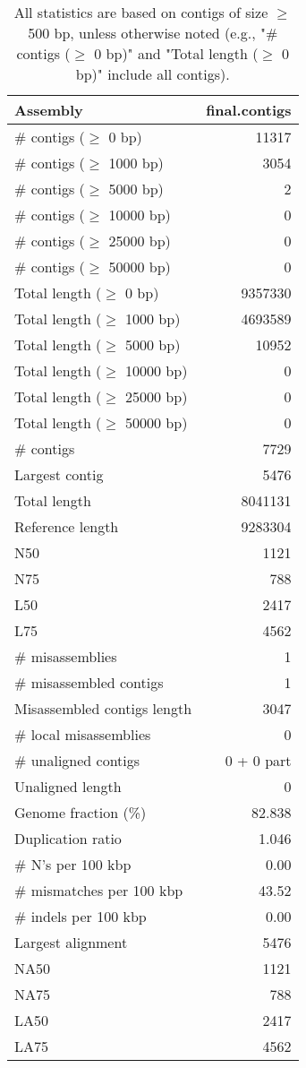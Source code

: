 \documentclass[12pt,a4paper]{article}
\begin{document}
\begin{table}[ht]
\begin{center}
\caption{All statistics are based on contigs of size $\geq$ 500 bp, unless otherwise noted (e.g., "\# contigs ($\geq$ 0 bp)" and "Total length ($\geq$ 0 bp)" include all contigs).}
\begin{tabular}{|l*{1}{|r}|}
\hline
Assembly & final.contigs \\ \hline
\# contigs ($\geq$ 0 bp) & 11317 \\ \hline
\# contigs ($\geq$ 1000 bp) & 3054 \\ \hline
\# contigs ($\geq$ 5000 bp) & 2 \\ \hline
\# contigs ($\geq$ 10000 bp) & 0 \\ \hline
\# contigs ($\geq$ 25000 bp) & 0 \\ \hline
\# contigs ($\geq$ 50000 bp) & 0 \\ \hline
Total length ($\geq$ 0 bp) & 9357330 \\ \hline
Total length ($\geq$ 1000 bp) & 4693589 \\ \hline
Total length ($\geq$ 5000 bp) & 10952 \\ \hline
Total length ($\geq$ 10000 bp) & 0 \\ \hline
Total length ($\geq$ 25000 bp) & 0 \\ \hline
Total length ($\geq$ 50000 bp) & 0 \\ \hline
\# contigs & 7729 \\ \hline
Largest contig & 5476 \\ \hline
Total length & 8041131 \\ \hline
Reference length & 9283304 \\ \hline
N50 & 1121 \\ \hline
N75 & 788 \\ \hline
L50 & 2417 \\ \hline
L75 & 4562 \\ \hline
\# misassemblies & 1 \\ \hline
\# misassembled contigs & 1 \\ \hline
Misassembled contigs length & 3047 \\ \hline
\# local misassemblies & 0 \\ \hline
\# unaligned contigs & 0 + 0 part \\ \hline
Unaligned length & 0 \\ \hline
Genome fraction (\%) & 82.838 \\ \hline
Duplication ratio & 1.046 \\ \hline
\# N's per 100 kbp & 0.00 \\ \hline
\# mismatches per 100 kbp & 43.52 \\ \hline
\# indels per 100 kbp & 0.00 \\ \hline
Largest alignment & 5476 \\ \hline
NA50 & 1121 \\ \hline
NA75 & 788 \\ \hline
LA50 & 2417 \\ \hline
LA75 & 4562 \\ \hline
\end{tabular}
\end{center}
\end{table}
\end{document}
